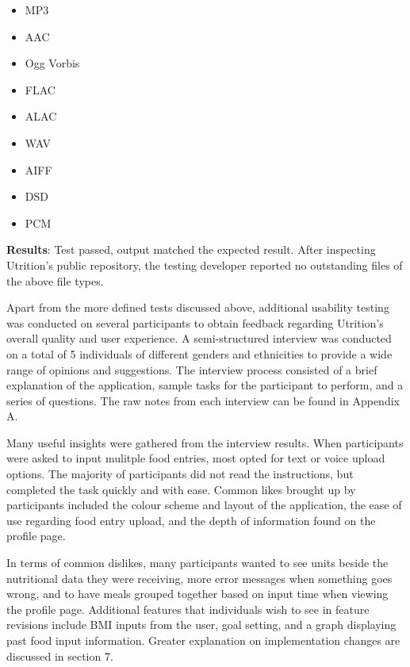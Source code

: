\documentclass[12pt, titlepage]{article}
\begin{document}
\begin{enumerate}
		\begin{itemize}
			\item MP3
			\item AAC
			\item Ogg Vorbis
			\item FLAC
			\item ALAC
			\item WAV
			\item AIFF
			\item DSD
			\item PCM
		\end{itemize}
	
	\textbf{Results}: Test passed, output matched the expected result. After inspecting Utrition's public repository, the testing developer reported no outstanding files of the above file types.
	
	\end{enumerate}

	Apart from the more defined tests discussed above, additional usability testing was conducted on several participants to obtain feedback regarding Utrition's overall quality and user experience. A semi-structured interview was conducted on a total of 5 individuals of different genders and ethnicities to provide a wide range of opinions and suggestions. The interview process consisted of a brief explanation of the application, sample tasks for the participant to perform, and a series of questions. The raw notes from each interview can be found in Appendix A.
	
	Many useful insights were gathered from the interview results. When participants were asked to input mulitple food entries, most opted for text or voice upload options. The majority of participants did not read the instructions, but completed the task quickly and with ease. Common likes brought up by participants included the colour scheme and layout of the application, the ease of use regarding food entry upload, and the depth of information found on the profile page.
	
	In terms of common dislikes, many participants wanted to see units beside the nutritional data they were receiving, more error messages when something goes wrong, and to have meals grouped together based on input time when viewing the profile page. Additional features that individuals wish to see in feature revisions include BMI inputs from the user, goal setting, and a graph displaying past food input information. Greater explanation on implementation changes are discussed in section 7.
	
\end{document}
